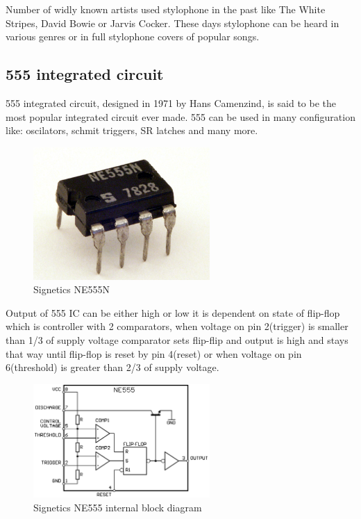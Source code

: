 \documentclass[english,10pt,a4paper]{article}
\begin{document}
	Number of widly known artists used stylophone in the past like The White Stripes, David Bowie or Jarvis Cocker. These days stylophone can be heard in various genres or in full stylophone covers of popular songs.
	
	\subsection{555 integrated circuit}
	555 integrated circuit, designed in 1971 by Hans Camenzind, is said to be the most popular integrated circuit ever made. 555 can be used in many configuration like: oscilators, schmit triggers, SR latches and many more.
	
	\begin{figure}[H]
		\centering
		\includegraphics[width=0.6\textwidth]{img/Signetics_NE555N.JPG}
		\caption{Signetics NE555N}
	\end{figure}
		
	Output of 555 IC can be either high or low it is dependent on state of flip-flop which is controller with 2 comparators, when voltage on pin 2(trigger) is smaller than 1/3 of supply voltage comparator sets flip-flip and output is high and stays that way until flip-flop is reset by pin 4(reset) or when voltage on pin 6(threshold) is greater than 2/3 of supply voltage.
		
	\begin{figure}[H]
		\centering
		\includegraphics[width=0.6\textwidth]{img/555_esquema.png}
		\caption{Signetics NE555 internal block diagram}
	\end{figure}
		
\end{document}
